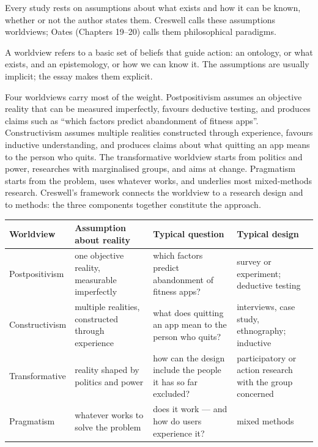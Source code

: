 \documentclass[11pt,a4paper,british,twoside=false,headings=small,chapterprefix=false,numbers=noenddot]{scrbook}
\newenvironment{block}[1]{\begin{tcolorbox}[scriptbox, title={#1}]}{\end{tcolorbox}}
\begin{document}
Every study rests on assumptions about what exists and how it can be known, whether or not the author states them. Creswell calls these assumptions worldviews; Oates (Chapters 19--20) calls them philosophical paradigms.

\begin{block}{Worldview (paradigm)}
A worldview refers to a basic set of beliefs that guide action: an ontology, or what exists, and an epistemology, or how we can know it. The assumptions are usually implicit; the essay makes them explicit.
\end{block}

Four worldviews carry most of the weight. Postpositivism assumes an objective reality that can be measured imperfectly, favours deductive testing, and produces claims such as ``which factors predict abandonment of fitness apps''. Constructivism assumes multiple realities constructed through experience, favours inductive understanding, and produces claims about what quitting an app means to the person who quits. The transformative worldview starts from politics and power, researches with marginalised groups, and aims at change. Pragmatism starts from the problem, uses whatever works, and underlies most mixed-methods research. Creswell's framework connects the worldview to a research design and to methods: the three components together constitute the approach.

\begin{center}\small
  \renewcommand{\arraystretch}{1.2}
  \begin{tabular}{@{}p{2.3cm}p{3.5cm}p{3.9cm}p{3.6cm}@{}}
    \toprule
    \textbf{Worldview} & \textbf{Assumption about reality} & \textbf{Typical question} & \textbf{Typical design}\\
    \midrule
    Postpositivism & one objective reality, measurable imperfectly & which factors predict abandonment of fitness apps? & survey or experiment; deductive testing\\
    Constructivism & multiple realities, constructed through experience & what does quitting an app mean to the person who quits? & interviews, case study, ethnography; inductive\\
    Transformative & reality shaped by politics and power & how can the design include the people it has so far excluded? & participatory or action research with the group concerned\\
    Pragmatism & whatever works to solve the problem & does it work --- and how do users experience it? & mixed methods\\
    \bottomrule
  \end{tabular}
\end{center}
\end{document}
